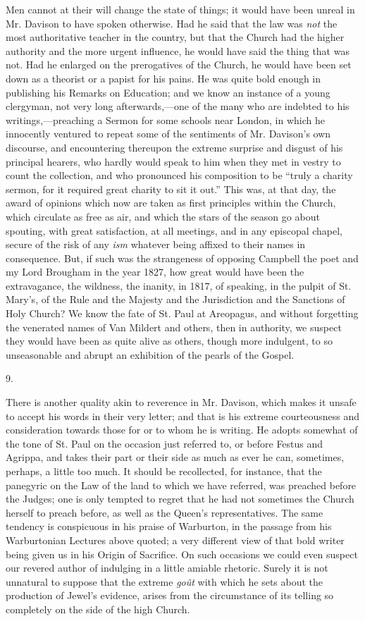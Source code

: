 Men cannot at their will change the state of
things; it would have been unreal in Mr. Davison to have spoken
otherwise. Had he said that the law was \emph{not} the most authoritative teacher in the country, but that the Church had the
higher authority and the more urgent influence, he would have said the
thing that was not. Had he enlarged on the prerogatives of the Church,
he would have been set down as a theorist or a papist for his pains.
He was quite bold enough in publishing his Remarks on Education; and
we know an instance of a young clergyman, not very long
afterwards,—one of the many who are indebted to his
writings,—preaching a Sermon for some schools near London, in which
he innocently ventured to repeat some of the sentiments of Mr. Davison's
own discourse, and encountering thereupon the extreme surprise and
disgust of his principal hearers, who hardly would speak to him when
they met in vestry to count the collection, and who pronounced his
composition to be ``truly a charity sermon, for it required great
charity to sit it out.'' This was, at that day, the award of opinions
which now are taken as first principles within the Church, which
circulate as free as air, and which the stars of the season go about
spouting, with great satisfaction, at all meetings, and in any
episcopal chapel, secure of the risk of any \emph{ism} whatever being
affixed to their names in consequence. But, if such was the
strangeness of opposing Campbell the poet and my Lord Brougham in the
year 1827, how great would have been the extravagance, the wildness,
the inanity, in 1817, of speaking, in the pulpit of St. Mary's, of the
Rule and the Majesty and the Jurisdiction and the Sanctions of Holy
Church? We know the fate of St. Paul at Areopagus, and without
forgetting the venerated names of Van Mildert and others, then in
authority, we suspect they would have been as quite alive as others,
though more indulgent, to so unseasonable and abrupt an exhibition of
the pearls of the Gospel.

9.

There is another quality akin to reverence in Mr.
Davison, which makes it unsafe to accept his words in their very
letter; and that is his extreme courteousness and consideration
towards those for or to whom he is writing. He adopts somewhat of the
tone of St. Paul on the occasion just referred to, or before Festus
and Agrippa, and takes their part or their side as much as ever he
can, sometimes, perhaps, a little too much. It should be recollected,
for instance, that the panegyric on the Law of the land to which we
have referred, was preached before the Judges; one is only tempted to
regret that he had not sometimes the Church herself to preach before,
as well as the Queen's representatives. The same tendency is
conspicuous in his praise of Warburton, in the passage from his
Warburtonian Lectures above quoted; a very different view of that bold
writer being given us in his Origin of Sacrifice. On such occasions we
could even suspect our revered author of indulging in a little amiable
rhetoric. Surely it is not unnatural to suppose that the extreme \emph{goût}
with which he sets about the production of Jewel's evidence, arises
from the circumstance of its telling so completely on the side of the
high Church.

